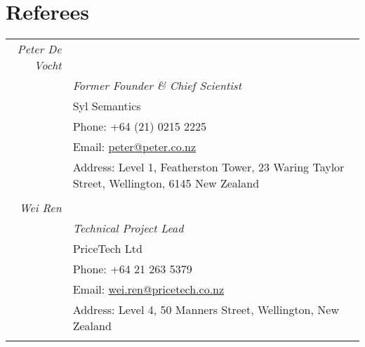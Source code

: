 \documentclass[a4paper,10pt]{article} %
\begin{document}
\section{Referees}

\begin{tabular}{r|p{11cm}}


\emph{Peter De Vocht}&  \\
& \emph{Former Founder \& Chief Scientist}\\ 
& Syl Semantics \\
& Phone: +64 (21) 0215 2225\\
& Email: \href{mailto:peter@peter.co.nz}{peter@peter.co.nz}\\
& Address: Level 1, Featherston Tower, 23 Waring Taylor Street, Wellington, 6145 New Zealand \\
\multicolumn{2}{c}{} \\




\emph{Wei Ren}&  \\
& \emph{Technical Project Lead}\\ 
& PriceTech Ltd\\
& Phone: +64 21 263 5379\\
& Email: \href{mailto:wei.ren@pricetech.co.nz}{wei.ren@pricetech.co.nz}\\
& Address: Level 4, 50 Manners Street, Wellington, New Zealand \\
\multicolumn{2}{c}{} \\




\end{tabular}
\end{document}
